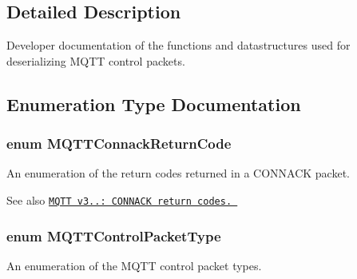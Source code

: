 \subsection{Detailed Description}
Developer documentation of the functions and datastructures used for deserializing M\+Q\+TT control packets. 



\subsection{Enumeration Type Documentation}
\subsubsection[{\texorpdfstring{M\+Q\+T\+T\+Connack\+Return\+Code}{MQTTConnackReturnCode}}]{\setlength{\rightskip}{0pt plus 5cm}enum {\bf M\+Q\+T\+T\+Connack\+Return\+Code}}\hypertarget{group__unpackers_ga07e480dfa5738e60c54ad0447ddb1a25}{}\label{group__unpackers_ga07e480dfa5738e60c54ad0447ddb1a25}


An enumeration of the return codes returned in a C\+O\+N\+N\+A\+CK packet. 

\begin{DoxySeeAlso}{See also}
\href{http://docs.oasis-open.org/mqtt/mqtt/v3.1.1/os/mqtt-v3.1.1-os.html#_Table_3.1_-}{\tt M\+Q\+TT v3..\+: C\+O\+N\+N\+A\+CK return codes. } 
\end{DoxySeeAlso}
\subsubsection[{\texorpdfstring{M\+Q\+T\+T\+Control\+Packet\+Type}{MQTTControlPacketType}}]{\setlength{\rightskip}{0pt plus 5cm}enum {\bf M\+Q\+T\+T\+Control\+Packet\+Type}}\hypertarget{group__unpackers_gacbd36b88ec7f62bc161b07e1a0aed679}{}\label{group__unpackers_gacbd36b88ec7f62bc161b07e1a0aed679}


An enumeration of the M\+Q\+TT control packet types. 

